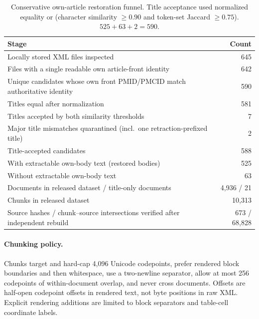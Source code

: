 \begin{table}[h]
\centering
\small
\caption{Conservative own-article restoration funnel. Title acceptance used normalized equality or (character similarity $\geq0.90$ and token-set Jaccard $\geq0.75$). $525+63+2=590$.}
\label{tab:funnel}
\begin{tabular}{@{}lr@{}}
\toprule
Stage & Count \\
\midrule
Locally stored XML files inspected & 645 \\
Files with a single readable own article-front identity & 642 \\
Unique candidates whose own front PMID/PMCID match authoritative identity & 590 \\
\quad Titles equal after normalization & 581 \\
\quad Titles accepted by both similarity thresholds & 7 \\
\quad Major title mismatches quarantined (incl.\ one retraction-prefixed title) & 2 \\
Title-accepted candidates & 588 \\
\quad With extractable own-body text (restored bodies) & 525 \\
\quad Without extractable own-body text & 63 \\
Documents in released dataset / title-only documents & 4,936 / 21 \\
Chunks in released dataset & 10,313 \\
Source hashes / chunk--source intersections verified after independent rebuild & 673 / 68,828 \\
\bottomrule
\end{tabular}
\end{table}

\paragraph{Chunking policy.}
Chunks target and hard-cap 4,096 Unicode codepoints, prefer rendered block boundaries and then whitespace, use a two-newline separator, allow at most 256 codepoints of within-document overlap, and never cross documents. Offsets are half-open codepoint offsets in rendered text, not byte positions in raw XML. Explicit rendering additions are limited to block separators and table-cell coordinate labels.

